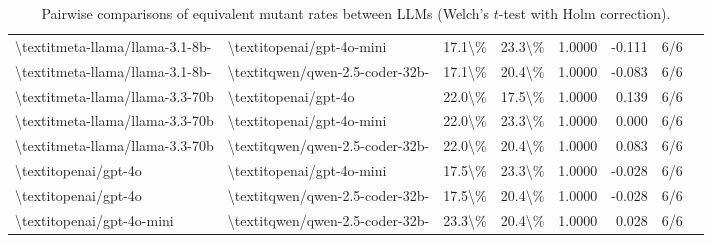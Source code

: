 \begin{table}[htbp]
{\begin{tabular}{ll|rrrrrl}
\textbackslash{}textit{meta-llama/llama-3.1-8b-} & \textbackslash{}textit{openai/gpt-4o-mini} & 17.1\textbackslash{}\% & 23.3\textbackslash{}\% & 1.0000 & -0.111 & 6/6 \\
\textbackslash{}textit{meta-llama/llama-3.1-8b-} & \textbackslash{}textit{qwen/qwen-2.5-coder-32b-} & 17.1\textbackslash{}\% & 20.4\textbackslash{}\% & 1.0000 & -0.083 & 6/6 \\
\textbackslash{}textit{meta-llama/llama-3.3-70b} & \textbackslash{}textit{openai/gpt-4o} & 22.0\textbackslash{}\% & 17.5\textbackslash{}\% & 1.0000 & 0.139 & 6/6 \\
\textbackslash{}textit{meta-llama/llama-3.3-70b} & \textbackslash{}textit{openai/gpt-4o-mini} & 22.0\textbackslash{}\% & 23.3\textbackslash{}\% & 1.0000 & 0.000 & 6/6 \\
\textbackslash{}textit{meta-llama/llama-3.3-70b} & \textbackslash{}textit{qwen/qwen-2.5-coder-32b-} & 22.0\textbackslash{}\% & 20.4\textbackslash{}\% & 1.0000 & 0.083 & 6/6 \\
\textbackslash{}textit{openai/gpt-4o} & \textbackslash{}textit{openai/gpt-4o-mini} & 17.5\textbackslash{}\% & 23.3\textbackslash{}\% & 1.0000 & -0.028 & 6/6 \\
\textbackslash{}textit{openai/gpt-4o} & \textbackslash{}textit{qwen/qwen-2.5-coder-32b-} & 17.5\textbackslash{}\% & 20.4\textbackslash{}\% & 1.0000 & -0.028 & 6/6 \\
\textbackslash{}textit{openai/gpt-4o-mini} & \textbackslash{}textit{qwen/qwen-2.5-coder-32b-} & 23.3\textbackslash{}\% & 20.4\textbackslash{}\% & 1.0000 & 0.028 & 6/6 \\
\bottomrule
\end{tabular}
}
\caption{Pairwise comparisons of equivalent mutant rates between LLMs (Welch's $t$-test with Holm correction).}
\label{tab:llm-equiv-stats}
\end{table}
